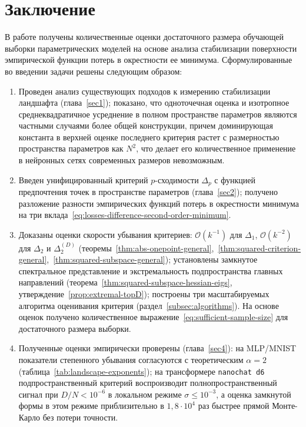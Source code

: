 \cleardoublepage
{}
{}
\section*{Заключение}

В работе получены количественные оценки достаточного размера обучающей выборки параметрических моделей на основе анализа стабилизации поверхности эмпирической функции потерь в окрестности ее минимума. Сформулированные во введении задачи решены следующим образом:

\begin{enumerate}
    \item Проведен анализ существующих подходов к измерению стабилизации ландшафта (глава~\ref{sec1}); показано, что одноточечная оценка и изотропное среднеквадратичное усреднение в полном пространстве параметров являются частными случаями более общей конструкции, причем доминирующая константа в верхней оценке последнего критерия растет с размерностью пространства параметров как $N^2$, что делает его количественное применение в нейронных сетях современных размеров невозможным.
    \item Введен унифицированный критерий $p$-сходимости $\Delta_p$ с функцией предпочтения точек в пространстве параметров (глава~\ref{sec2}); получено разложение разности эмпирических функций потерь в окрестности минимума на три вклада~\eqref{eq:losses-difference-second-order-minimum}.
    \item Доказаны оценки скорости убывания критериев: $\mathcal O(k^{-1})$ для $\Delta_1$, $\mathcal O(k^{-2})$ для $\Delta_2$ и $\Delta_2^{(D)}$ (теоремы~\ref{thm:abs-onepoint-general},~\ref{thm:squared-criterion-general},~\ref{thm:squared-subspace-general}); установлены замкнутое спектральное представление и экстремальность подпространства главных направлений (теорема~\ref{thm:squared-subspace-hessian-eigs}, утверждение~\ref{prop:extremal-topD}); построены три масштабируемых алгоритма оценивания критерия (раздел~\ref{subsec:algorithms}). На основе оценок получено количественное выражение~\eqref{eq:sufficient-sample-size} для достаточного размера выборки.
    \item Полученные оценки эмпирически проверены (глава~\ref{sec4}): на MLP/MNIST показатели степенного убывания согласуются с теоретическим $\alpha=2$ (таблица~\ref{tab:landscape-exponents}); на трансформере \texttt{nanochat d6} подпространственный критерий воспроизводит полнопространственный сигнал при $D/N < 10^{-6}$ в локальном режиме $\sigma \leqslant 10^{-3}$, а оценка замкнутой формы в этом режиме приблизительно в $1{,}8\cdot 10^4$ раз быстрее прямой Монте-Карло без потери точности.
\end{enumerate}


